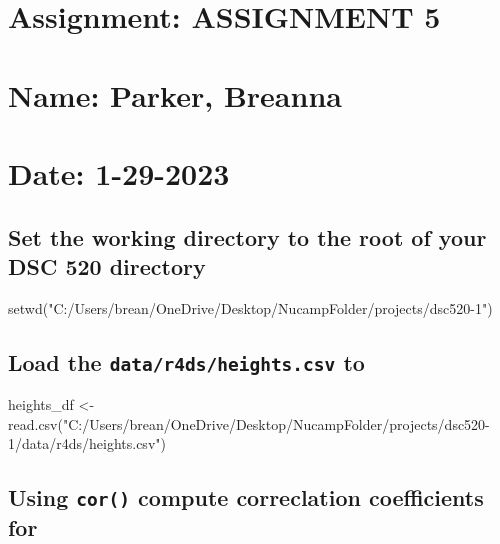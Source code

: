 \documentclass[
]{article}
\author{}
\date{\vspace{-2.5em}}
\newenvironment{Shaded}{\begin{snugshade}}{\end{snugshade}}
\newcommand{\FunctionTok}[1]{\textcolor[rgb]{0.00,0.00,0.00}{#1}}
\newcommand{\NormalTok}[1]{#1}
\newcommand{\OtherTok}[1]{\textcolor[rgb]{0.56,0.35,0.01}{#1}}
\newcommand{\StringTok}[1]{\textcolor[rgb]{0.31,0.60,0.02}{#1}}
\begin{document}
\hypertarget{assignment-assignment-5}{%
\section{Assignment: ASSIGNMENT 5}\label{assignment-assignment-5}}

\hypertarget{name-parker-breanna}{%
\section{Name: Parker, Breanna}\label{name-parker-breanna}}

\hypertarget{date-1-29-2023}{%
\section{Date: 1-29-2023}\label{date-1-29-2023}}

\hypertarget{set-the-working-directory-to-the-root-of-your-dsc-520-directory}{%
\subsection{Set the working directory to the root of your DSC 520
directory}\label{set-the-working-directory-to-the-root-of-your-dsc-520-directory}}

\begin{Shaded}
\begin{Highlighting}[]
\FunctionTok{setwd}\NormalTok{(}\StringTok{"C:/Users/brean/OneDrive/Desktop/NucampFolder/projects/dsc520{-}1"}\NormalTok{)}
\end{Highlighting}
\end{Shaded}

\hypertarget{load-the-datar4dsheights.csv-to}{%
\subsection{\texorpdfstring{Load the \texttt{data/r4ds/heights.csv}
to}{Load the data/r4ds/heights.csv to}}\label{load-the-datar4dsheights.csv-to}}

\begin{Shaded}
\begin{Highlighting}[]
\NormalTok{heights\_df }\OtherTok{\textless{}{-}} \FunctionTok{read.csv}\NormalTok{(}\StringTok{"C:/Users/brean/OneDrive/Desktop/NucampFolder/projects/dsc520{-}1/data/r4ds/heights.csv"}\NormalTok{)}
\end{Highlighting}
\end{Shaded}

\hypertarget{using-cor-compute-correclation-coefficients-for}{%
\subsection{\texorpdfstring{Using \texttt{cor()} compute correclation
coefficients
for}{Using cor() compute correclation coefficients for}}\label{using-cor-compute-correclation-coefficients-for}}
\end{document}
